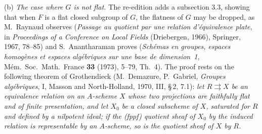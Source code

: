 (b) \emph{The case where \(G\) is not flat.} The re-edition adds a subsection 3.3, showing that when
\(F\) is a flat closed subgroup of \(G\), the flatness of \(G\) may be dropped, as M.~Raynaud observes
(\emph{Passage au quotient par une relation d'équivalence plate}, in \emph{Proceedings of a
Conference on Local Fields} (Driebergen, 1966), Springer, 1967, 78--85) and S.~Anantharaman proves
(\emph{Schémas en groupes, espaces homogènes et espaces algébriques sur une base de dimension~1},
Mém.\ Soc.\ Math.\ France \textbf{33} (1973), 5--79, Th.~4). The proof rests on the following
theorem of Grothendieck (M.~Demazure, P.~Gabriel, \emph{Groupes algébriques}, I, Masson and
North-Holland, 1970, III, \S\,2, 7.1): \emph{let \(R\rightrightarrows X\) be an equivalence relation on
an \(A\)-scheme \(X\) whose two projections are faithfully flat and of finite presentation, and let
\(X_0\) be a closed subscheme of \(X\), saturated for \(R\) and defined by a nilpotent ideal; if the
(fppf) quotient sheaf of \(X_0\) by the induced relation is representable by an \(A\)-scheme, so is
the quotient sheaf of \(X\) by \(R\).}

